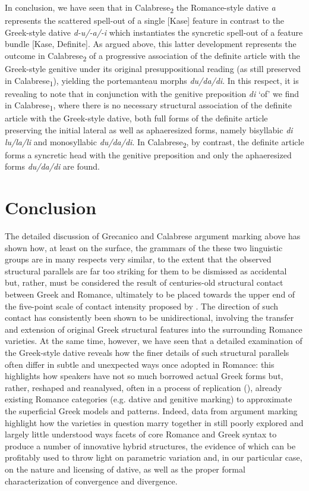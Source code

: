 \documentclass[output=paper,modfonts,nonflat,colorlinks,citecolor=brown]{langsci/langscibook}
\begin{document}
In conclusion, we have seen that in Calabrese\textsubscript{2} the Romance-style dative \textit{a} represents the scattered spell-out of a single [Kase] feature in contrast to the Greek-style dative \textit{d-u/-a/-i} which instantiates the syncretic spell-out of a feature bundle [Kase, Definite]. As argued above, this latter development represents the outcome in Calabrese\textsubscript{2} of a progressive association of the definite article with the Greek-style genitive under its original presuppositional reading (as still preserved in Calabrese\textsubscript{1}), yielding the portemanteau morphs \textit{du/da/di}. In this respect, it is revealing to note that in conjunction with the genitive preposition \textit{di} ‘of’ we find in Calabrese\textsubscript{1}, where there is no necessary structural association of the definite article with the Greek-style dative, both full forms of the definite article preserving the initial lateral as well as aphaeresized forms, namely bisyllabic \textit{di lu/la/li} and monosyllabic \textit{du/da/di}. In Calabrese\textsubscript{2}, by contrast, the definite article forms a syncretic head with the genitive preposition and only the aphaeresized forms \textit{du/da/di} are found.

\section{Conclusion}

The detailed discussion of Grecanico and Calabrese argument marking above has shown how, at least on the surface, the grammars of the these two linguistic groups are in many respects very similar, to the extent that the observed structural parallels are far too striking for them to be dismissed as accidental but, rather, must be considered the result of centuries-old structural contact between Greek and Romance, ultimately to be placed towards the upper end of the five-point scale of contact intensity proposed by \citet{ThomasonKaufman1988}. The direction of such contact has consistently been shown to be unidirectional, involving the transfer and extension of original Greek structural features into the surrounding Romance varieties. At the same time, however, we have seen that a detailed examination of the Greek-style dative reveals how the finer details of such structural parallels often differ in subtle and unexpected ways once adopted in Romance: this highlights how speakers have not so much borrowed actual Greek forms but, rather, reshaped and reanalysed, often in a process of replication (\citealt{HeineKuteva2003, HeineKuteva2005}), already existing Romance categories (e.g. dative and genitive marking) to approximate the superficial Greek models and patterns. Indeed, data from argument marking highlight how the varieties in question marry together in still poorly explored and largely little understood ways facets of core Romance and Greek syntax to produce a number of innovative hybrid structures, the evidence of which can be profitably used to throw light on parametric variation and, in our particular case, on the nature and licensing of dative, as well as the proper formal characterization of convergence and divergence. 
\end{document}
